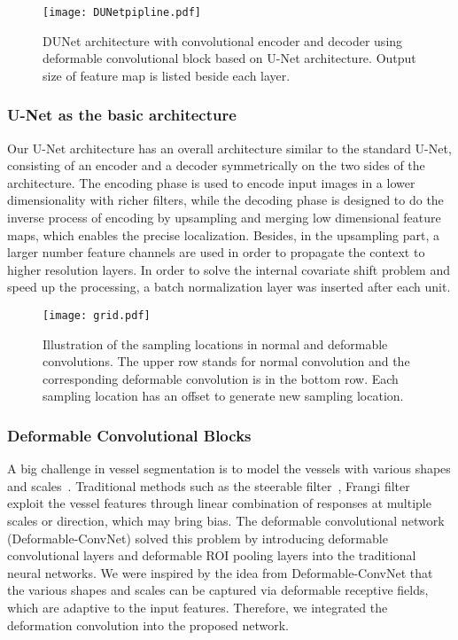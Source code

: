 \documentclass[journal]{IEEEtran}
\begin{document}
\begin{figure*}
\centering
\texttt{[image: DUNetpipline.pdf]}
\caption{DUNet architecture with convolutional encoder and decoder using deformable convolutional block based on U-Net architecture. Output size of feature map is listed beside each layer.}
\label{fig:DUNetpipline}
\end{figure*}

\subsubsection{U-Net as the basic architecture}
Our U-Net architecture has an overall architecture similar to the standard U-Net, consisting of an encoder and a decoder symmetrically on the two sides of the architecture. The encoding phase is used to encode input images in a lower dimensionality with richer filters, while the decoding phase is designed to do the inverse process of encoding by upsampling and merging low dimensional feature maps, which enables the precise localization. Besides, in the upsampling part, a larger number feature channels are used in order to propagate the context to higher resolution layers. In order to solve the internal covariate shift problem and speed up the processing, a batch normalization layer was inserted after each unit.
\begin{figure}
\centering
\texttt{[image: grid.pdf]}
\caption{Illustration of the sampling locations in  normal and deformable convolutions. The upper row stands for normal convolution and the corresponding deformable convolution is in the bottom row. Each sampling location has an offset to generate new sampling location.}
\label{fig:grid}
\end{figure}
\subsubsection{Deformable Convolutional Blocks}
A big challenge in vessel segmentation is to model the vessels with various shapes and scales~\cite{dai_deformable_2017}. Traditional methods such as the steerable filter~\cite{freeman_design_1991}, Frangi filter~\cite{frangi_muliscale_1998} exploit the vessel features through linear combination of responses at multiple scales or direction, which may bring bias. The deformable convolutional network (Deformable-ConvNet) solved this problem by introducing deformable convolutional layers and deformable ROI pooling layers into the traditional neural networks. We were inspired by the idea from Deformable-ConvNet that the various shapes and scales can be captured via deformable receptive fields, which are adaptive to the input features. Therefore, we integrated the deformation convolution into the proposed network.
\end{document}
